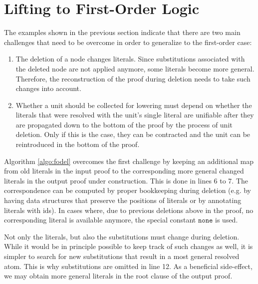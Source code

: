 \section{Lifting \LowerUnits to First-Order Logic} \label{sec:FOLU}

The examples shown in the previous section indicate that there are two main challenges that need to be overcome in order to generalize \LowerUnits to the first-order case:
\begin{enumerate}
\item The deletion of a node changes literals. Since substitutions associated with the deleted node are not applied anymore, some literals become more general. Therefore, the reconstruction of the proof during deletion needs to take such changes into account.
\item Whether a unit should be collected for lowering must depend on whether the literals that were resolved with the unit's single literal are unifiable after they are propagated down to the bottom of the proof by the process of unit deletion. Only if this is the case, they can be contracted and the unit can be reintroduced in the bottom of the proof.
\end{enumerate}

\newcommand{\none}{\texttt{none}}

\noindent
Algorithm \ref{algo:fodel} overcomes the first challenge by keeping an additional map from old literals in the input proof to the corresponding more general changed literals in the output proof under construction. This is done in lines 6 to 7. The correspondence can be computed by proper bookkeeping during deletion (e.g. by having data structures that preserve the positions of literals or by annotating literals with ids). In cases where, due to previous deletions above in the proof, no corresponding literal is available anymore, the special constant $\none$ is used. 

Not only the literals, but also the substitutions must change during deletion. While it would be in principle possible to keep track of such changes as well, it is simpler to search for new substitutions that result in a most general resolved atom. This is why substitutions are omitted in line 12. As a beneficial side-effect, we may obtain more general literals in the root clause of the output proof.



\newcommand{\dl}[1]{#1^{\dagger}}

